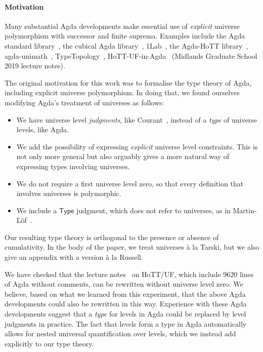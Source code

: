 \documentclass[a4paper,UKenglish,cleveref, autoref, thm-restate]{lipics-v2021}
\newcommand{\Type}{\mathsf{Type}}
\begin{document}
\paragraph*{Motivation}
Many substantial Agda developments make essential use of \emph{explicit} universe polymorphism with successor and finite suprema. Examples include the Agda standard library~\cite{agda:stdlib}, the cubical Agda library~\cite{cubical:agda}, 1Lab~\cite{agda:1lab}, the Agda-HoTT library~\cite{hott:agda}, agda-unimath~\cite{agda:unimath}, TypeTopology~\cite{TypeTopology},
HoTT-UF-in-Agda~\cite{hott:uf:in:agda} (Midlands Graduate School 2019 lecture notes).

The original motivation for this work was to formalise the type theory of Agda, including explicit universe polymorphism. In doing that, we found ourselves modifying Agda's treatment of universes as follows:
\begin{itemize}
\item We have universe level \emph{judgments}, like Courant~\cite{Courant02}, instead of a \emph{type} of universe levels, like Agda.

 \item We add the possibility of expressing \emph{explicit} universe
 level constraints. This is not only more general but also arguably
 gives a more natural way of expressing types involving universes.

 \item We do not require a first universe level zero, so that every definition that involves universes is polymorphic.

 \item We include a $\Type$ judgment, which does not refer to universes, as in Martin-L\"of~\cite{martinlof:hannover}.

\end{itemize}

Our resulting type theory is orthogonal to the presence or absence of cumulativity. In the body of the paper, we treat universes \`a la Tarski, but we also give an appendix with a version \`a la Russell.


We have checked that the lecture notes~\cite{hott:uf:in:agda} on HoTT/UF, which include 9620 lines of Agda without comments, can be rewritten without universe level zero. We believe, based on what we learned from this experiment, that the above Agda developments could also be rewritten in this way. Experience with these Agda developments suggest that a \emph{type} for levels in Agda could be replaced by level judgments in practice. The fact that levels form a type in Agda automatically allows for nested universal quantification over levels, which we instead add explicitly to our type theory.
\end{document}
